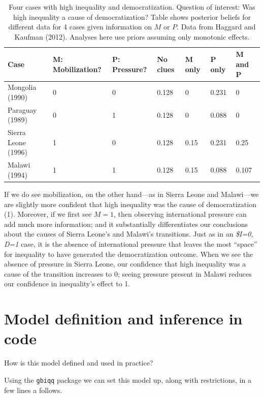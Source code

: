 \documentclass[12pt,]{book}
\begin{document}
\begin{table}[t]

\caption{\label{tab:HK8cases2}Four cases with high inequality and  democratization. Question of interest: Was high inequality a cause of democratization? Table shows posterior beliefs for different data for 4 cases given information on $M$ or $P$. Data from Haggard and Kaufman (2012). Analyses here use priors assuming only monotonic effects.}
\centering
\begin{tabular}{l|l|l|l|l|l|l}
\hline
Case & M: Mobilization? & P: Pressure? & No clues & M only & P only & M and P\\
\hline
Mongolia (1990) & 0 & 0 & 0.128 & 0 & 0.231 & 0\\
\hline
Paraguay (1989) & 0 & 1 & 0.128 & 0 & 0.088 & 0\\
\hline
Sierra Leone (1996) & 1 & 0 & 0.128 & 0.15 & 0.231 & 0.25\\
\hline
Malawi (1994) & 1 & 1 & 0.128 & 0.15 & 0.088 & 0.107\\
\hline
\end{tabular}
\end{table}

If we do see mobilization, on the other hand---as in Sierra Leone and Malawi---we are slightly more confident that high inequality was the cause of democratization (1). Moreover, if we first see \(M=1\), then observing international pressure can add much more information; and it substantially differentiates our conclusions about the causes of Sierra Leone's and Malawi's transitions. Just as in an \emph{\$I=0, D=1} case, it is the absence of international pressure that leaves the most ``space'' for inequality to have generated the democratization outcome. When we see the absence of pressure in Sierra Leone, our confidence that high inequality was a cause of the transition increases to 0; seeing pressure present in Malawi reduces our confidence in inequality's effect to 1.

\hypertarget{model-definition-and-inference-in-code}{%
\section{Model definition and inference in code}\label{model-definition-and-inference-in-code}}

How is this model defined and used in practice?

Using the \texttt{gbiqq} package we can set this model up, along with restrictions, in a few lines a follows.
\end{document}
